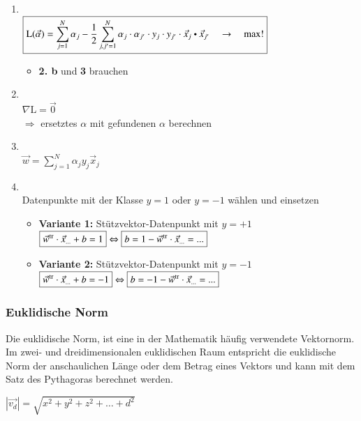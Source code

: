 \begin{enumerate}
    \item {}\\
        $\boxed{\mathrm{L}(\vec{\alpha})=\sum_{j=1}^N\alpha_j-\frac{1}{2}\sum_{j,j'=1}^N\alpha_j \cdot \alpha_{j'} \cdot \space y_j \cdot y_{j'} \cdot \space \vec{x}_j \dotp  \vec{x}_{j'}\quad\to\quad\max!}$
        \begin{itemize}
            \item \textbf{2. b} und \textbf{3} brauchen
        \end{itemize}
    \item {}\\
            $\boxed{\nabla \mathrm{L} = \vec{0}}$\\
            $\Rightarrow$ ersetztes $\alpha$ mit gefundenen $\alpha$ berechnen 
    \item {}\\
        $\boxed{\vec{w}=\sum_{j=1}^N\alpha_jy_j\vec{x}_j}$
    \item {}\\
        Datenpunkte mit der Klasse $y = 1$ oder $y = -1$ wählen und einsetzen
        \begin{itemize}
            \item \textbf{Variante 1:} Stützvektor-Datenpunkt mit $y = +1$\\
                $\boxed{\vec{w}^{\operatorname{tr}}\cdot\vec{x}_{...} + b = 1} \Leftrightarrow  \boxed{b = 1 -\vec{w}^{\operatorname{tr}}\cdot\vec{x}_{...} = ...}$
            \item \textbf{Variante 2:} Stützvektor-Datenpunkt mit $y = -1$\\
                $\boxed{\vec{w}^{\operatorname{tr}}\cdot\vec{x}_{...} + b = -1} \Leftrightarrow  \boxed{b = -1 -\vec{w}^{\operatorname{tr}}\cdot\vec{x}_{...} = ...}$
        \end{itemize}
\end{enumerate}

\subsubsection{Euklidische Norm}
Die euklidische Norm, ist eine in der Mathematik häufig verwendete Vektornorm.
Im zwei- und dreidimensionalen euklidischen Raum entspricht die euklidische Norm der anschaulichen Länge
oder dem Betrag eines Vektors und kann mit dem Satz des Pythagoras berechnet werden.
\begin{center}
    $\boxed{\left\lvert \vec{v_d}\right\rvert = \sqrt{x^2 + y^2 + z^2 + \dots + d^2}}$    
\end{center}


